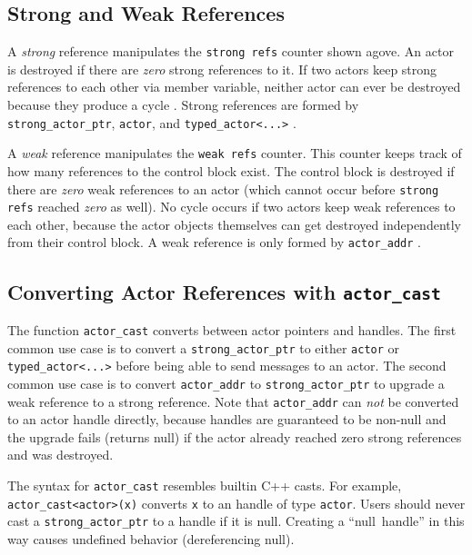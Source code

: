 \subsection{Strong and Weak References}

A \emph{strong} reference manipulates the \lstinline^strong refs^ counter shown agove. An actor is destroyed if there are \emph{zero} strong references to it. If two actors keep strong references to each other via member variable, neither actor can ever be destroyed because they produce a cycle . Strong references are formed by \lstinline^strong_actor_ptr^, \lstinline^actor^, and \lstinline^typed_actor<...>^ .

A \emph{weak} reference manipulates the \lstinline^weak refs^ counter. This counter keeps track of how many references to the control block exist. The control block is destroyed if there are \emph{zero} weak references to an actor (which cannot occur before \lstinline^strong refs^ reached \emph{zero} as well). No cycle occurs if two actors keep weak references to each other, because the actor objects themselves can get destroyed independently from their control block.  A weak reference is only formed by \lstinline^actor_addr^ .

\subsection{Converting Actor References with \texttt{actor\_cast}}

The function \lstinline^actor_cast^ converts between actor pointers and handles. The first common use case is to convert a \lstinline^strong_actor_ptr^ to either \lstinline^actor^ or \lstinline^typed_actor<...>^ before being able to send messages to an actor. The second common use case is to convert \lstinline^actor_addr^ to \lstinline^strong_actor_ptr^ to upgrade a weak reference to a strong reference. Note that \lstinline^actor_addr^ can \emph{not} be converted to an actor handle directly, because handles are guaranteed to be non-null and the upgrade fails (returns null) if the actor already reached zero strong references and was destroyed.

The syntax for \lstinline^actor_cast^ resembles builtin C++ casts. For example, \lstinline^actor_cast<actor>(x)^ converts \lstinline^x^ to an handle of type \lstinline^actor^. Users should never cast a \lstinline^strong_actor_ptr^ to a handle if it is null. Creating a ``null~handle'' in this way causes undefined behavior (dereferencing null).

